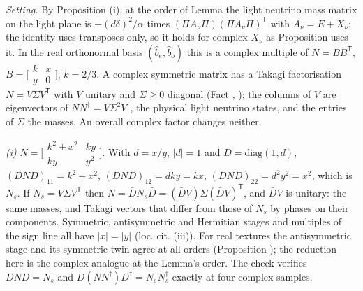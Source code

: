 \emph{Setting.} By Proposition (i), at the order of Lemma  the light neutrino mass matrix on the light plane is $-(d\delta)^{2}/\alpha$ times $(\Pi A_{\nu}\Pi)(\Pi A_{\nu}\Pi)^{\mathsf T}$ with $A_{\nu} = E + X_{\nu}$; the identity uses transposes only, so it holds for complex $X_{\nu}$ as Proposition  uses it. In the real orthonormal basis $(\hat{b}_{e}, \hat{b}_{o})$ this is a complex multiple of $N = BB^{\mathsf T}$, $B = \bigl[\begin{smallmatrix} k & x\\ y & 0\end{smallmatrix}\bigr]$, $k = 2/3$. A complex symmetric matrix has a Takagi factorisation $N = V\Sigma V^{\mathsf T}$ with $V$ unitary and $\Sigma \ge 0$ diagonal (Fact , \cite[Cor.~4.4.4]{HornJohnson}); the columns of $V$ are eigenvectors of $NN^{\dagger} = V\Sigma^{2}V^{\dagger}$, the physical light neutrino states, and the entries of $\Sigma$ the masses. An overall complex factor changes neither.

\emph{(i)} $N = \bigl[\begin{smallmatrix} k^{2} + x^{2} & ky\\ ky & y^{2}\end{smallmatrix}\bigr]$. With $d = x/y$, $|d| = 1$ and $D = \mathrm{diag}(1, d)$, $(DND)_{11} = k^{2} + x^{2}$, $(DND)_{12} = dky = kx$, $(DND)_{22} = d^{2}y^{2} = x^{2}$, which is $N_{s}$. If $N_{s} = V\Sigma V^{\mathsf T}$ then $N = \bar{D}N_{s}\bar{D} = (\bar{D}V)\Sigma(\bar{D}V)^{\mathsf T}$, and $\bar{D}V$ is unitary: the same masses, and Takagi vectors that differ from those of $N_{s}$ by phases on their components. Symmetric, antisymmetric and Hermitian stages and multiples of the sign line all have $|x| = |y|$ (loc. cit. (iii)). For real textures the antisymmetric stage and its symmetric twin agree at all orders (Proposition ); the reduction here is the complex analogue at the Lemma's order. The check verifies $DND = N_{s}$ and $D(NN^{\dagger})D^{\dagger} = N_{s}N_{s}^{\dagger}$ exactly at four complex samples.

